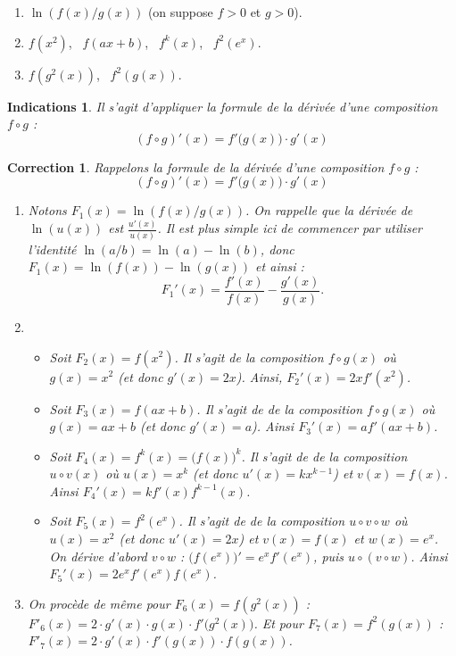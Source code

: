 \documentclass[11pt,a4paper]{article}
\theoremstyle{exostyle}
\newtheorem{ind}{Indications}
\newtheorem{cor}{Correction}
\newcommand{\indication}{\begin{ind}} \newcommand{\finindication}{\end{ind}}
\newcommand{\correction}{\begin{cor}} \newcommand{\fincorrection}{\end{cor}}
\begin{document}
\begin{enumerate}
	\item $\ln(f(x)/g(x))$ (on suppose $f>0$ et $g>0$).
	\item $f(x^2)$, \  $f(ax+b)$, \  $f^k(x)$, \  $f^2(e^x)$.
	\item $f(g^2(x))$, \  $f^2(g(x))$.
\end{enumerate}
\finenonce
\indication
Il s'agit d'appliquer la formule de la dérivée d'une composition $f \circ g$ :
$$(f \circ g)'(x) = f'\big( g(x) \big) \cdot g'(x)$$
\finindication
\correction
Rappelons la formule de la dérivée d'une composition $f \circ g$ :
$$(f \circ g)'(x) = f'\big( g(x) \big) \cdot g'(x)$$
\begin{enumerate}
	\item Notons $F_1(x) = \ln(f(x)/g(x))$.
	On rappelle que la dérivée de $\ln(u(x))$ est $\frac{u'(x)}{u(x)}$.
	Il est plus simple ici de commencer par utiliser l'identité $\ln(a/b) = \ln(a)-\ln(b)$, donc 
	$F_1(x) =  \ln(f(x)) - \ln(g(x))$ et ainsi :
	$$F_1'(x) = \frac{f'(x)}{f(x)} - \frac{g'(x)}{g(x)}.$$
	
	\item 
	\begin{itemize}
		\item Soit $F_2(x) = f(x^2)$. Il s'agit de la composition $f \circ g(x)$ où $g(x)=x^2$ (et donc $g'(x) = 2x$). Ainsi, $F_2'(x) = 2xf'(x^2)$.
	
		\item Soit $F_3(x) = f(ax+b)$. Il s'agit de de la composition $f \circ g(x)$ où $g(x)=ax+b$ (et donc $g'(x) = a$). Ainsi $F_3'(x) = af'(ax+b)$.
		
		\item Soit $F_4(x) = f^k(x) = \big( f(x) \big)^k$. Il s'agit de de la composition $u \circ v(x)$ où $u(x)= x^k$ (et donc $u'(x) = kx^{k-1}$) et $v(x) = f(x)$. Ainsi $F_4'(x) = kf'(x)f^{k-1}(x)$.	
		
		\item Soit $F_5(x) = f^2(e^x)$. Il s'agit de de la composition $u \circ v \circ w$ où $u(x)= x^2$ (et donc $u'(x) = 2x$) et $v(x) = f(x)$ et $w(x)=e^x$. 
		On dérive d'abord $v \circ w$ : $\big( f(e^x) \big)' = e^x f'(e^x)$, puis $u \circ (v \circ w)$. Ainsi $F_5'(x) = 2 e^xf'(e^x)f(e^x)$.
	\end{itemize}
	
	\item On procède de même pour 
	$F_6(x) = f(g^2(x))$ : 
	$F'_6(x) = 2 \cdot g'(x) \cdot g(x) \cdot f'\big( g^2(x) \big)$.
	Et pour $F_7(x) = f^2(g(x))$ :
	$F'_7(x) = 2 \cdot g'(x) \cdot f'(g(x)) \cdot f(g(x))$.	
\end{enumerate}
\fincorrection
\finexercice
\end{document}
